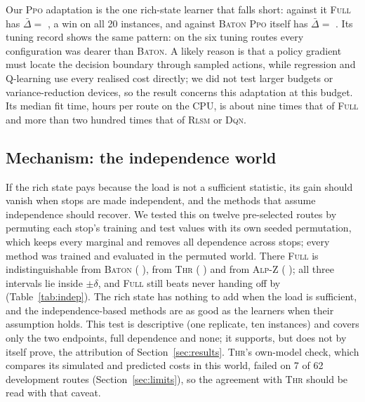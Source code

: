 \documentclass[trsc,dblanonrev]{informs4}
\newcommand{\Full}{\textsc{Full}}
\newcommand{\Baton}{\textsc{Baton}}
\newcommand{\Thr}{\textsc{Thr}}
\newcommand{\Alpz}{\textsc{Alp-Z}}
\newcommand{\Rlsm}{\textsc{Rlsm}}
\newcommand{\Dqn}{\textsc{Dqn}}
\newcommand{\Ppo}{\textsc{Ppo}}
\begin{document}
Our \Ppo{} adaptation is the one rich-state learner that falls short: against
it \Full{} has $\bar\Delta = $ \BPpo{} \BPpoCI{}, a win on all 20 instances,
and against \Baton{} \Ppo{} itself has $\bar\Delta = $ \BPpoVsBaton{}. Its
tuning record shows the same pattern: on the six tuning routes every
configuration was dearer than \Baton{}. A likely reason is that a policy
gradient must locate the decision boundary through sampled actions, while
regression and Q-learning use every realised cost directly; we did not test
larger budgets or variance-reduction devices, so the result concerns this
adaptation at this budget. Its median fit time, \PpoHours{} hours per route on
the CPU, is about nine times that of \Full{} and more than two hundred times
that of \Rlsm{} or \Dqn{}.

\subsection{Mechanism: the independence world}\label{sec:indep}

\begin{table}[t]
{\scriptsize}{}
\end{table}

If the rich state pays because the load is not a sufficient statistic, its
gain should vanish when stops are made independent, and the methods that
assume independence should recover. We tested this on twelve pre-selected
routes by permuting each stop's training and test values with its own seeded
permutation, which keeps every marginal and removes all dependence across
stops; every method was trained and evaluated in the permuted world. There
\Full{} is indistinguishable from \Baton{} (\BIndBaton{} \BIndBatonCI{}), from
\Thr{} (\BIndThr{} \BIndThrCI{}) and from \Alpz{} (\BIndAlpz{}
\BIndAlpzCI{}); all three intervals lie inside $\pm\delta$, and \Full{} still
beats never handing off by \BIndNone{} (Table~\ref{tab:indep}). The rich state
has nothing to add when the load is sufficient, and the independence-based
methods are as good as the learners when their assumption holds. This test is
descriptive (one replicate, ten instances) and covers only the two endpoints,
full dependence and none; it supports, but does not by itself prove, the
attribution of Section~\ref{sec:results}. \Thr{}'s own-model check, which
compares its simulated and predicted costs in this world, failed on 7 of 62
development routes (Section~\ref{sec:limits}), so the agreement with \Thr{}
should be read with that caveat.
\end{document}

